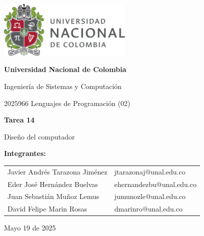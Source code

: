 \documentclass{article}
\begin{document}
\begin{titlepage}
  \centering
  \includegraphics[width=0.48\textwidth]{logo_universidad.png}
  \par\vspace{2cm}

  {\Large \textbf{Universidad Nacional de Colombia} \par}
  \vspace{0.5cm}
  {\large Ingeniería de Sistemas y Computación \par}
  {\large 2025966 Lenguajes de Programación (02)\par}
  \vspace{3cm}

  {\large \textbf{Tarea 14} \par}
  {\large Diseño del computador\par}
  \vspace{3cm}

  {\large \textbf{Integrantes:} \par}
  \vspace{0.5cm}
  \begin{tabular}{ll}
    Javier Andrés Tarazona Jiménez & jtarazonaj@unal.edu.co \\
    Eder  José Hernández Buelvas   & ehernandezbu@unal.edu.co \\
    Juan Sebastián Muñoz Lemus     & jumunozle@unal.edu.co   \\
    David Felipe Marin Rosas       & dmarinro@unal.edu.co   \\
  \end{tabular}
  \par\vspace{3cm}

  {\large Mayo 19 de 2025 \par}
\end{titlepage}

\tableofcontents %

\newpage %
\end{document}
